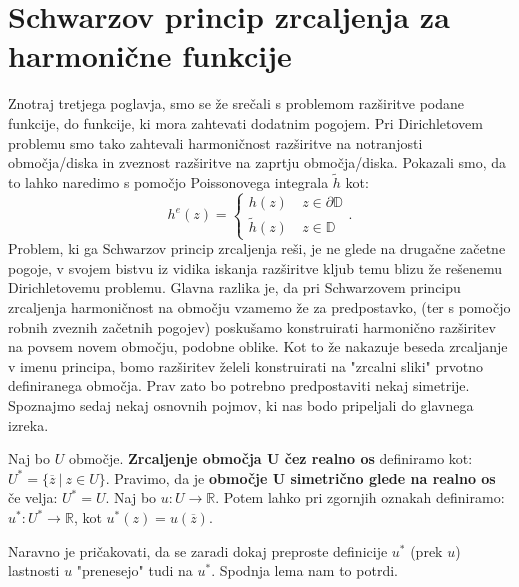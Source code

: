 \documentclass[mat1]{fmfdelo}
\begin{document}
\newpage
\section{Schwarzov princip zrcaljenja za harmonične funkcije}
    Znotraj tretjega poglavja, smo se že srečali s problemom razširitve podane funkcije, do funkcije, ki mora zahtevati dodatnim pogojem. 
    Pri Dirichletovem problemu smo tako zahtevali harmoničnost razširitve na notranjosti območja/diska in zveznost razširitve na zaprtju območja/diska. 
    Pokazali smo, da to lahko naredimo s pomočjo Poissonovega integrala $\widetilde{h}$ kot:
    $$
        h^e(z) = 
        \begin{cases}
            h(z)~&z \in \partial \mathbb{D} \\
            \widetilde{h}(z)~&z \in \mathbb{D}
        \end{cases}.
    $$
    Problem, ki ga Schwarzov princip zrcaljenja reši, je ne glede na drugačne začetne pogoje, v svojem bistvu iz vidika iskanja razširitve kljub temu blizu že rešenemu Dirichletovemu problemu.
    Glavna razlika je, da pri Schwarzovem principu zrcaljenja harmoničnost na območju vzamemo že za predpostavko, (ter s pomočjo robnih zveznih začetnih pogojev) poskušamo konstruirati harmonično razširitev na povsem novem območju, podobne oblike.  
    Kot to že nakazuje beseda zrcaljanje v imenu principa, bomo razširitev želeli konstruirati na "zrcalni sliki" prvotno definiranega območja. Prav zato bo potrebno predpostaviti nekaj simetrije.
    Spoznajmo sedaj nekaj osnovnih pojmov, ki nas bodo pripeljali do glavnega izreka.
    \begin{definicija}
        Naj bo $U$ območje. \textbf{Zrcaljenje območja U čez realno os} definiramo kot: $U^* = \{\overline{z}~|~z \in U\}$.
        \newline
        Pravimo, da je \textbf{območje U simetrično glede na realno os} če velja: $U^* = U$.
        \newline
        Naj bo $u: U \to \mathbb{R}$. Potem lahko pri zgornjih oznakah definiramo: $u^*: U^* \to \mathbb{R}$, kot $u^*(z) = u(\overline{z})$.
    \end{definicija}

    Naravno je pričakovati, da se zaradi dokaj preproste definicije $u^*$ (prek $u$) lastnosti $u$ "prenesejo" tudi na $u^*$. 
    Spodnja lema nam to potrdi.
\end{document}
